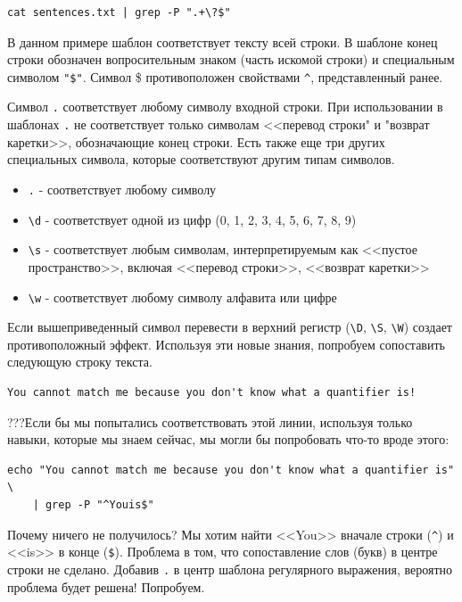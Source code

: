 \documentclass[12pt]{article}
\providecommand{\tightlist}{%
  \setlength{\itemsep}{0pt}\setlength{\parskip}{0pt}}
\begin{document}
\begin{verbatim}
cat sentences.txt | grep -P ".+\?$"
\end{verbatim}

В данном примере шаблон соответствует тексту всей строки. В шаблоне
конец строки обозначен вопросительным знаком (часть искомой строки) и
специальным символом \texttt{"\$"}. Символ \$ противоположен свойствами
\texttt{\^{}}, представленный ранее.

Символ \texttt{.} соответствует любому символу входной строки. При
использовании в шаблонах \texttt{.} не соответствует только символам
<<перевод строки" и "возврат каретки>>, обозначающие конец строки. Есть
также еще три других специальных символа, которые соответствуют другим
типам символов.

\begin{itemize}
\tightlist
\item
  \texttt{.} - соответствует любому символу
\item
  \texttt{\textbackslash{}d} - соответствует одной из цифр (0, 1, 2, 3,
  4, 5, 6, 7, 8, 9)
\item
  \texttt{\textbackslash{}s} - соответствует любым символам,
  интерпретируемым как <<пустое пространство>>, включая <<перевод строки>>,
  <<возврат каретки>>
\item
  \texttt{\textbackslash{}w} - соответствует любому символу алфавита или
  цифре
\end{itemize}

Если вышеприведенный символ перевести в верхний регистр
(\texttt{\textbackslash{}D}, \texttt{\textbackslash{}S},
\texttt{\textbackslash{}W}) создает противоположный эффект. Используя
эти новые знания, попробуем сопоставить следующую строку текста.

\begin{verbatim}
You cannot match me because you don't know what a quantifier is!
\end{verbatim}

???Если бы мы попытались соответствовать этой линии, используя только
навыки, которые мы знаем сейчас, мы могли бы попробовать что-то вроде
этого:

\begin{verbatim}
echo "You cannot match me because you don't know what a quantifier is" \
    | grep -P "^Youis$"
\end{verbatim}

Почему ничего не получилось? Мы хотим найти <<You>> вначале строки
(\texttt{\^{}}) и <<is>> в конце (\texttt{\$}). Проблема в том, что
сопоставление слов (букв) в центре строки не сделано. Добавив \texttt{.}
в центр шаблона регулярного выражения, вероятно проблема будет решена!
Попробуем.
\end{document}
